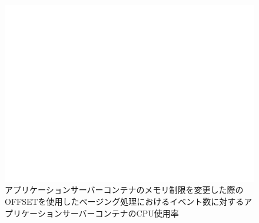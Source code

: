\documentclass[../../../../../main]{subfiles}
\begin{document}
    \begin{figure}[H]
        \centering
        \includegraphics[width=12cm]{graph}
        \caption{アプリケーションサーバーコンテナのメモリ制限を変更した際のOFFSETを使用したページング処理におけるイベント数に対するアプリケーションサーバーコンテナのCPU使用率}
        \label{fig:paging-offset-change-app-memory-limit-app-cpu-app_4_db_1_1024}
    \end{figure}
\end{document}
